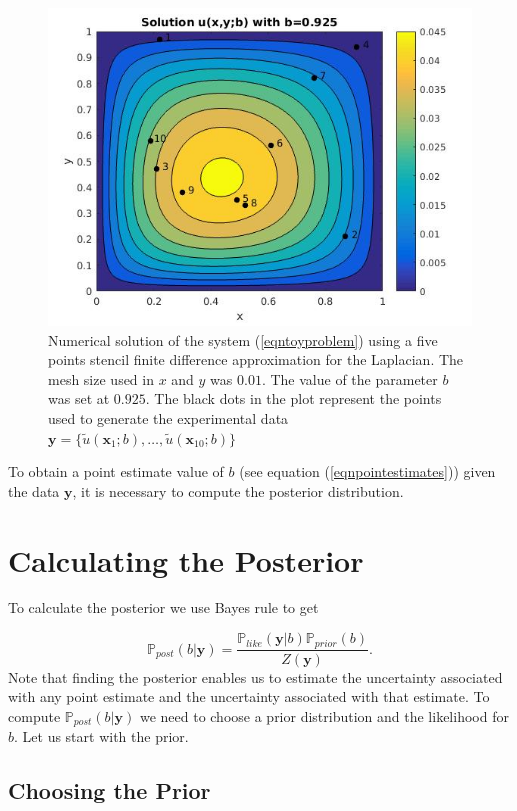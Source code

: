 \documentclass[12pt]{book}
\newcommand{\post}{\mathbb{P}_{post}}
\newcommand{\like}{\mathbb{P}_{like}}
\newcommand{\prior}{\mathbb{P}_{prior}}
\newcommand{\x}{\textbf{x}}
\newcommand{\y}{\textbf{y}}
\begin{document}
\begin{figure}[H]
\centering
\includegraphics[scale=0.5]{./FigChap3/solu}
\caption{Numerical solution of the system (\ref{eqntoyproblem}) using a five points stencil finite difference
approximation for the Laplacian. The mesh
size used in $x$ and $y$ was $0.01$. The value of the parameter $b$ was set at $0.925$. The black dots
in the plot represent the points used to generate the experimental data 
$\y=\{\tilde{u}(\x_{1};b),\ldots,\tilde{u}(\x_{10};b)\}$}
\label{figsolU}
\end{figure}

To obtain a point estimate value of $b$ (see equation (\ref{eqnpointestimates})) given the data $\y$, it is necessary
to compute the posterior distribution. 

\section{Calculating the Posterior}
To calculate the posterior we use Bayes rule to get

\begin{equation} \label{eqnpropto}
\post(b|\y)=\frac{\like(\y|b)\prior(b)}{Z(\y)}.
\end{equation}
Note that finding the posterior enables us to estimate the uncertainty associated with any point
estimate and the uncertainty associated with that estimate.
To compute $\post(b|\y)$ we need to choose
a prior distribution and the likelihood for $b$. Let us start with the prior. 

\subsection{Choosing the Prior}
\end{document}
